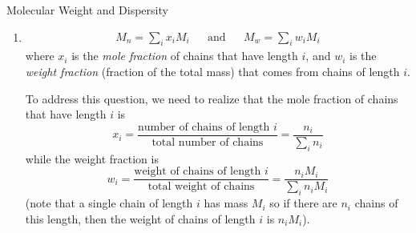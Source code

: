 \begin{activity}{Molecular Weight and Dispersity}
\begin{exercises}
\begin{enumerate}
					\begin{solution}{}
					
						On page \pageref{\labelbase:infobox:MnMw}, we are told that he number-average molecular weight is given by
	\begin{equation*}
		M_n = M_0 \frac{\sum_i n_i i}{\sum_i n_i}
	\end{equation*}
	while the weight-average molecular weight is given by
	\begin{equation*}
		M_w = M_0 \frac{\sum_i n_i i^2 }{\sum_i n_i i}
	\end{equation*}
	
	To rewrite these expressions in the requested form, we just need to recognize that the molecular weight of a chain of length $i$ is $M_i = M_0 i$.  Thus, rearranging,
	\begin{align*}
		M_n = M_0 \frac{\sum_i n_i i}{\sum_i n_i}
			= \frac{\sum_i  n_i M_0 i}{\sum_i n_i}
			= \frac{\sum_i  n_i M_i}{\sum_i n_i}
	\end{align*}
	and
	\begin{align*}
		M_w = M_0 \frac{\sum_i n_i i^2 }{\sum_i n_i i}
			= \frac{M_0^2}{M_0} \frac{\sum_i n_i i^2 }{\sum_i n_i i}
			= \frac{\sum_i n_i M_0^2 i^2 }{\sum_i n_i M_0 i}
			= \frac{\sum_i n_i M_i^2 }{\sum_i n_i M_i}
	\end{align*}
	as desired.
	
					\end{solution}
				
				\item  \begin{align*}
					M_n = \sum_i x_i M_i && \text{and} && M_w = \sum_i w_i M_i
				\end{align*}
					where $x_i$ is the \emph{mole fraction} of chains that have length $i$, and $w_i$ is the \emph{weight fraction} (fraction of the total mass) that comes from chains of length $i$.
					
					\begin{solution}{}
						To address this question, we need to realize that the mole fraction of chains that have length $i$ is
						\begin{equation*}
							x_i = \frac{\text{number of chains of length } i}{\text{total number of chains}} = \frac{n_i}{\sum_i n_i}
						\end{equation*}
						while the weight fraction is
						\begin{equation*}
							w_i = \frac{\text{weight of chains of length } i}{\text{total weight of chains}} = \frac{n_i M_i}{\sum_i n_i M_i}
						\end{equation*}
						(note that a single chain of length $i$ has mass $M_i$ so if there are $n_i$ chains of this length, then the weight of chains of length $i$ is $n_i M_i$).
						

\end{solution}
\end{enumerate}
\end{exercises}
\end{activity}
